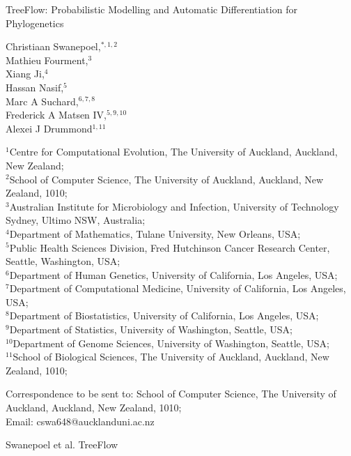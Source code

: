 
TreeFlow: Probabilistic Modelling and Automatic Differentiation for Phylogenetics

Christiaan Swanepoel,$^{\ast, 1, 2}$\\
Mathieu Fourment,$^{3}$\\
Xiang Ji,$^{4}$\\
Hassan Nasif,$^{5}$\\
Marc A Suchard,$^{6,7,8}$\\
Frederick A Matsen IV,$^{5,9,10}$\\
Alexei J Drummond$^{1,11}$

${^1}$Centre for Computational Evolution, The University of Auckland, Auckland, New Zealand;\\
$^{2}$School of Computer Science, The University of Auckland, Auckland, New Zealand, 1010;\\
$^{3}$Australian Institute for Microbiology and Infection, University of Technology Sydney, Ultimo NSW, Australia;\\
$^{4}$Department of Mathematics, Tulane University, New Orleans, USA;\\
$^{5}$Public Health Sciences Division, Fred Hutchinson Cancer Research Center, Seattle, Washington, USA;\\
$^{6}$Department of Human Genetics, University of California, Los Angeles, USA;\\
$^{7}$Department of Computational Medicine, University of California, Los Angeles, USA;\\
$^{8}$Department of Biostatistics, University of California, Los Angeles, USA;\\
$^{9}$Department of Statistics, University of Washington, Seattle, USA;\\
$^{10}$Department of Genome Sciences, University of Washington, Seattle, USA;\\
$^{11}$School of Biological Sciences, The University of Auckland, Auckland, New Zealand, 1010;\\

Correspondence to be sent to: School of Computer Science, The University of Auckland, Auckland, New Zealand, 1010;\\
Email: cswa648@aucklanduni.ac.nz

Swanepoel et al.
TreeFlow

